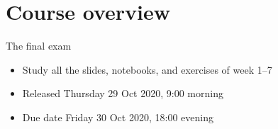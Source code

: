 \documentclass[aspectratio=169,usenames,dvipsnames]{beamer}
\begin{document}



























\section{Course overview}
\frame{\tableofcontents[currentsubsection]}

\begin{frame}{The final exam}
    \begin{itemize}
        \item Study all the slides, notebooks, and exercises of week 1--7
        \item Released Thursday 29 Oct 2020, 9:00 morning
        \item Due date Friday 30 Oct 2020, 18:00 evening
    \end{itemize}
\end{frame}
\end{document}
